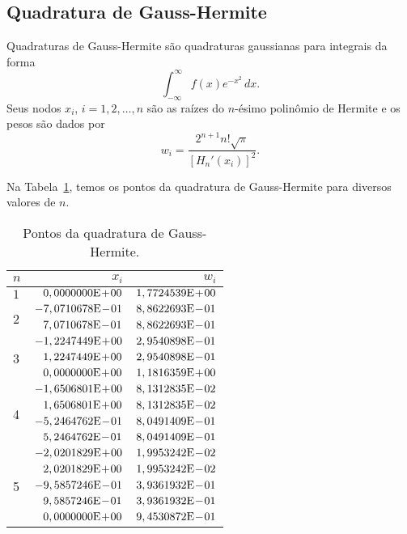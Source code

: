 \subsection{Quadratura de Gauss-Hermite}

Quadraturas de Gauss-Hermite são quadraturas gaussianas para integrais da forma
\begin{equation}
  \int_{-\infty}^\infty f(x)e^{-x^2}\,dx.
\end{equation}
Seus nodos $x_i$, $i=1, 2, \dotsc, n$ são as raízes do $n$-ésimo polinômio de Hermite e os pesos são dados por
\begin{equation}
  w_i = \frac{2^{n+1}n!\sqrt{\pi}}{[H_n'(x_i)]^2}.
\end{equation}

Na Tabela~\ref{tab:quad_GH}, temos os pontos da quadratura de Gauss-Hermite para diversos valores de $n$.

\begin{table}[h!]
  \centering
  \caption{Pontos da quadratura de Gauss-Hermite.}
  \begin{tabular}{lrr}
    $n$ & $x_i$ & $w_i$ \\\hline
    $1$ & $0,0000000\mathrm{E}\!+\!00$ & $1,7724539\mathrm{E}\!+\!00$ \\
    \multirow{2}{*}{2}
    & $-7,0710678\mathrm{E}\!-\!01$ & $8,8622693\mathrm{E}\!-\!01$ \\
    & $7,0710678\mathrm{E}\!-\!01$ & $8,8622693\mathrm{E}\!-\!01$ \\\hline
    \multirow{3}{*}{3}
    & $-1,2247449\mathrm{E}\!+\!00$ & $2,9540898\mathrm{E}\!-\!01$ \\
    & $1,2247449\mathrm{E}\!+\!00$ & $2,9540898\mathrm{E}\!-\!01$ \\
    & $0,0000000\mathrm{E}\!+\!00$ & $1,1816359\mathrm{E}\!+\!00$ \\\hline
    \multirow{4}{*}{4}
    & $-1,6506801\mathrm{E}\!+\!00$ & $8,1312835\mathrm{E}\!-\!02$ \\
    & $1,6506801\mathrm{E}\!+\!00$ & $8,1312835\mathrm{E}\!-\!02$ \\
    & $-5,2464762\mathrm{E}\!-\!01$ & $8,0491409\mathrm{E}\!-\!01$ \\
    & $5,2464762\mathrm{E}\!-\!01$ & $8,0491409\mathrm{E}\!-\!01$ \\\hline
    \multirow{5}{*}{5}
    & $-2,0201829\mathrm{E}\!+\!00$ & $1,9953242\mathrm{E}\!-\!02$ \\
    & $2,0201829\mathrm{E}\!+\!00$ & $1,9953242\mathrm{E}\!-\!02$ \\
    & $-9,5857246\mathrm{E}\!-\!01$ & $3,9361932\mathrm{E}\!-\!01$ \\
    & $9,5857246\mathrm{E}\!-\!01$ & $3,9361932\mathrm{E}\!-\!01$ \\
    & $0,0000000\mathrm{E}\!+\!00$ & $9,4530872\mathrm{E}\!-\!01$ \\\hline
  \end{tabular}
  \label{tab:quad_GH}
\end{table}

